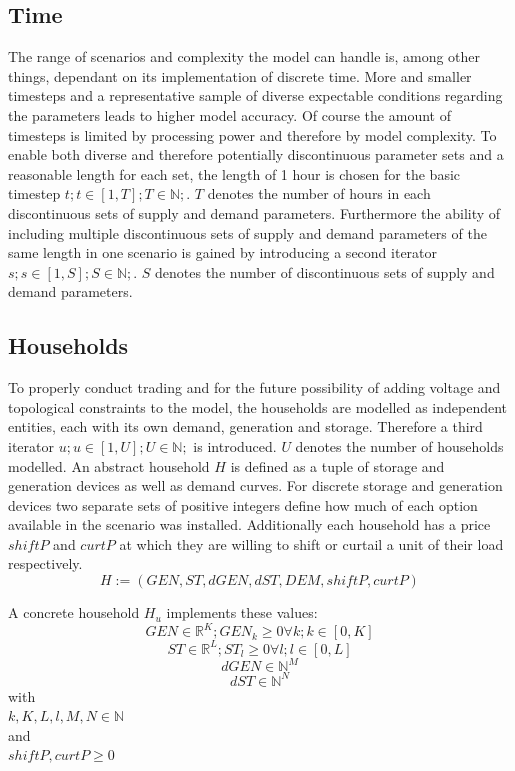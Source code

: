 \documentclass[
	11pt,								%
	DIV10,								%
	a4paper,         					%
	oneside,							%
	headheight=20pt,					%
	footheight=20pt,					%
    parskip=full,						%
    listof=totoc,						%
	bibliography=totoc,					%
	index=totoc,						%
]{scrartcl}
\begin{document}
\subsection{Time}
The range of scenarios and complexity the model can handle is, among other things, dependant on its implementation of discrete time. More and smaller timesteps and a representative sample of diverse expectable conditions regarding the parameters leads to higher model accuracy. Of course the amount of timesteps is limited by processing power and therefore by model complexity. To enable both diverse and therefore potentially discontinuous parameter sets and a reasonable length for each set, the length of 1 hour is chosen for the basic timestep 
$t; t \in [1,T]; T \in \mathbb{N} ;$. $T$ denotes the number of hours in each discontinuous sets of supply and demand parameters.
Furthermore the ability of including multiple discontinuous sets of supply and demand parameters of the same length in one scenario is gained by introducing a second iterator 
$s; s \in [1,S]; S \in \mathbb{N} ;$. $S$ denotes the number of discontinuous sets of supply and demand parameters.





\subsection{Households}
To properly conduct trading and for the future possibility of adding voltage and topological constraints to the model, the households are modelled as independent entities, each with its own demand, generation and storage. Therefore a third iterator $u; u \in [1,U]; U \in \mathbb{N};$ is introduced. $U$ denotes the number of households modelled.
An abstract household $H$ is defined as a tuple of storage and generation devices as well as demand curves. For discrete storage and generation devices two separate sets of positive integers define how much of each option available in the scenario was installed. Additionally each household has a price $shiftP$ and $curtP$ at which they are willing to shift or curtail a unit  of their load respectively.
\begin{equation}
	H := (GEN, ST, dGEN, dST, DEM, shiftP, curtP)
\end{equation}

A concrete household $H_u$ implements these values:
\begin{equation}
	GEN \in \mathbb{R}^{K}; GEN_k \geq 0 \forall k; k\in [0,K]
\end{equation}
\begin{equation}
	ST \in \mathbb{R}^{L}; ST_l \geq 0 \forall l; l\in [0,L] 
\end{equation}
\begin{equation}
	dGEN \in \mathbb{N}^{M}
\end{equation}
\begin{equation}
	dST \in \mathbb{N}^{N}
\end{equation}
with\\
$k,K,L,l,M,N \in \mathbb{N}$\\
and\\
$shiftP, curtP \geq 0$
\end{document}
